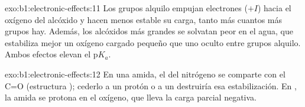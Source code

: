 \begin{solution}{exo:b1:electronic-effects:11}
Los grupos alquilo empujan electrones ($+I$) hacia el oxígeno del
alcóxido y hacen menos estable su carga, tanto más cuantos más grupos
hay. Además, los alcóxidos más grandes se solvatan peor en el agua, que
estabiliza mejor un oxígeno cargado pequeño que uno oculto entre grupos
alquilo. Ambos efectos elevan el $\mathrm{p}K_a$.
\end{solution}

\begin{solution}{exo:b1:electronic-effects:12}
En una amida, el  del nitrógeno se comparte con el C=O
(estructura ); cederlo a un protón o a un 
destruiría esa estabilización. En , la amida se protona en el
oxígeno, que lleva la carga parcial negativa.
\end{solution}

